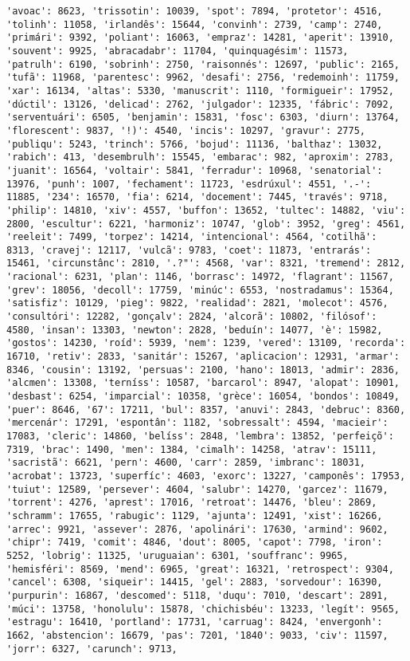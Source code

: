 \begin{Verbatim}[commandchars=\\\{\}]
'avoac': 8623, 'trissotin': 10039, 'spot': 7894, 'protetor': 4516, 'tolinh': 11058, 'irlandês': 15644, 'convinh': 2739, 'camp': 2740, 'primári': 9392, 'poliant': 16063, 'empraz': 14281, 'aperit': 13910, 'souvent': 9925, 'abracadabr': 11704, 'quinquagésim': 11573, 'patrulh': 6190, 'sobrinh': 2750, 'raisonnés': 12697, 'public': 2165, 'tufã': 11968, 'parentesc': 9962, 'desafi': 2756, 'redemoinh': 11759, 'xar': 16134, 'altas': 5330, 'manuscrit': 1110, 'formigueir': 17952, 'dúctil': 13126, 'delicad': 2762, 'julgador': 12335, 'fábric': 7092, 'serventuári': 6505, 'benjamin': 15831, 'fosc': 6303, 'diurn': 13764, 'florescent': 9837, '!)': 4540, 'incis': 10297, 'gravur': 2775, 'publiqu': 5243, 'trinch': 5766, 'bojud': 11136, 'balthaz': 13032, 'rabich': 413, 'desembrulh': 15545, 'embarac': 982, 'aproxim': 2783, 'juanit': 16564, 'voltair': 5841, 'ferradur': 10968, 'senatorial': 13976, 'punh': 1007, 'fechament': 11723, 'esdrúxul': 4551, '.-': 11885, '234': 16570, 'fia': 6214, 'docement': 7445, 'través': 9718, 'philip': 14810, 'xiv': 4557, 'buffon': 13652, 'tultec': 14882, 'viu': 2800, 'escultur': 6221, 'harmoniz': 10747, 'glob': 3952, 'greg': 4561, 'reeleit': 7499, 'torpez': 14214, 'intencional': 4564, 'cotilhã': 8313, 'cravej': 12117, 'vulcã': 9783, 'coet': 11873, 'entrarás': 15461, 'circunstânc': 2810, '.?"': 4568, 'var': 8321, 'tremend': 2812, 'racional': 6231, 'plan': 1146, 'borrasc': 14972, 'flagrant': 11567, 'grev': 18056, 'decoll': 17759, 'minúc': 6553, 'nostradamus': 15364, 'satisfiz': 10129, 'pieg': 9822, 'realidad': 2821, 'molecot': 4576, 'consultóri': 12282, 'gonçalv': 2824, 'alcorã': 10802, 'filósof': 4580, 'insan': 13303, 'newton': 2828, 'beduín': 14077, 'è': 15982, 'gostos': 14230, 'roíd': 5939, 'nem': 1239, 'vered': 13109, 'recorda': 16710, 'retiv': 2833, 'sanitár': 15267, 'aplicacion': 12931, 'armar': 8346, 'cousin': 13192, 'persuas': 2100, 'hano': 18013, 'admir': 2836, 'alcmen': 13308, 'terníss': 10587, 'barcarol': 8947, 'alopat': 10901, 'desbast': 6254, 'imparcial': 10358, 'grèce': 16054, 'bondos': 10849, 'puer': 8646, '67': 17211, 'bul': 8357, 'anuvi': 2843, 'debruc': 8360, 'mercenár': 17291, 'espontân': 1182, 'sobressalt': 4594, 'macieir': 17083, 'cleric': 14860, 'belíss': 2848, 'lembra': 13852, 'perfeiçõ': 7319, 'brac': 1490, 'men': 1384, 'cimalh': 14258, 'atrav': 15111, 'sacristã': 6621, 'pern': 4600, 'carr': 2859, 'imbranc': 18031, 'acrobat': 13723, 'superfíc': 4603, 'exorc': 13227, 'camponês': 17953, 'tuiut': 12589, 'persever': 4604, 'salubr': 14270, 'garcez': 11679, 'torrent': 4276, 'aprest': 17016, 'retroat': 14476, 'bleu': 2869, 'schramm': 17655, 'rabugic': 1129, 'ajunta': 12491, 'xist': 16266, 'arrec': 9921, 'assever': 2876, 'apolinári': 17630, 'armind': 9602, 'chipr': 7419, 'comit': 4846, 'dout': 8005, 'capot': 7798, 'iron': 5252, 'lobrig': 11325, 'uruguaian': 6301, 'souffranc': 9965, 'hemisféri': 8569, 'mend': 6965, 'great': 16321, 'retrospect': 9304, 'cancel': 6308, 'siqueir': 14415, 'gel': 2883, 'sorvedour': 16390, 'purpurin': 16867, 'descomed': 5118, 'duqu': 7010, 'descart': 2891, 'múci': 13758, 'honolulu': 15878, 'chichisbéu': 13233, 'legít': 9565, 'estragu': 16410, 'portland': 17731, 'carruag': 8424, 'envergonh': 1662, 'abstencion': 16679, 'pas': 7201, '1840': 9033, 'civ': 11597, 'jorr': 6327, 'carunch': 9713, 
\end{Verbatim}
